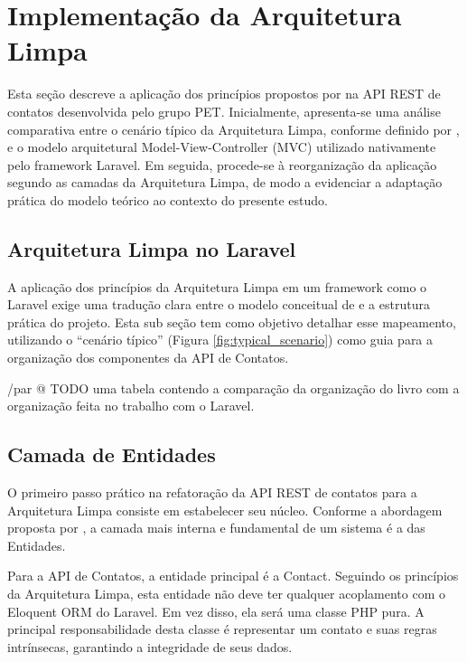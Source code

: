\section{Implementação da Arquitetura Limpa}

    \par Esta seção descreve a aplicação dos princípios propostos por \cite{livro:martin:cleanarch} na API REST de contatos desenvolvida pelo grupo PET. Inicialmente, apresenta-se uma análise comparativa entre o cenário típico da Arquitetura Limpa, conforme definido por \cite{livro:martin:cleanarch}, e o modelo arquitetural Model-View-Controller (MVC) utilizado nativamente pelo framework Laravel. Em seguida, procede-se à reorganização da aplicação segundo as camadas da Arquitetura Limpa, de modo a evidenciar a adaptação prática do modelo teórico ao contexto do presente estudo.

    \subsection{Arquitetura Limpa no Laravel}

        \par A aplicação dos princípios da Arquitetura Limpa em um framework como o Laravel exige uma tradução clara entre o modelo conceitual de \cite{livro:martin:cleanarch} e a estrutura prática do projeto. Esta sub seção tem como objetivo detalhar esse mapeamento, utilizando o ``cenário típico'' (Figura \ref{fig:typical_scenario}) como guia para a organização dos componentes da API de Contatos.

        /par @ TODO uma tabela contendo a comparação da organização do livro com a organização feita no trabalho com o Laravel.

    \subsection{Camada de Entidades}

        \par O primeiro passo prático na refatoração da API REST de contatos para a Arquitetura Limpa consiste em estabelecer seu núcleo. Conforme a abordagem proposta por \cite{livro:martin:cleanarch}, a camada mais interna e fundamental de um sistema é a das Entidades.

        \par Para a API de Contatos, a entidade principal é a Contact. Seguindo os princípios da Arquitetura Limpa, esta entidade não deve ter qualquer acoplamento com o Eloquent ORM do Laravel. Em vez disso, ela será uma classe PHP pura. A principal responsabilidade desta classe é representar um contato e suas regras intrínsecas, garantindo a integridade de seus dados.

